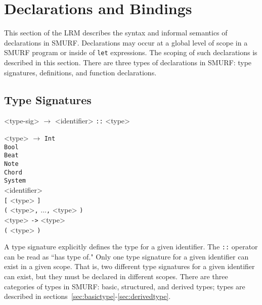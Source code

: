 \section{Declarations and Bindings}
\setlength{\grammarindent}{4em}

This section of the LRM describes the syntax and informal semantics of
declarations in SMURF. Declarations may occur at a global level of scope
in a SMURF program or inside of
\texttt{let} expressions. The scoping of such declarations is described 
in this section. There are three types of declarations in SMURF: 
type signatures, definitions, and function declarations.

\subsection{Type Signatures}

\begin{grammar}

<type-sig> $\rightarrow$ <identifier> \texttt{::} <type>

<type> $\rightarrow$ \texttt{Int} \\ \texttt{Bool} \\ \texttt{Beat} \\ \texttt{Note} \\
											\texttt{Chord} \\ \texttt{System} \\ <identifier> \\ 
											\texttt{[} <type> \texttt{]} \\ \texttt{(} <type>\texttt{,} 
											$\ldots$\texttt{,} <type> \texttt{)} \\ <type> \texttt{->} <type>
											 \\ \texttt{(} <type> \texttt{)}
										

\end{grammar}

A type signature explicitly defines the type for a given identifier. The
\texttt{::} operator can be read as ``has type of." Only one type signature
for a given identifier can exist in a given scope. That is, two different
type signatures for a given identifier can exist, but they must be declared
in different scopes. There are three categories of types in SMURF: basic,  structured, and derived types; types are described in sections~\ref{sec:basictype}-\ref{sec:derivedtype}.


